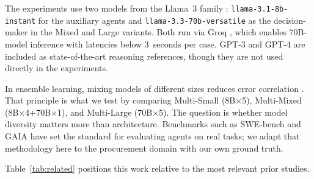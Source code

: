 \documentclass[preprint,12pt,numrefs]{elsarticle}
\begin{document}
The experiments use two models from the Llama~3 family
\citep{Meta2024llama3}: \texttt{llama-3.1-8b-instant} for the auxiliary
agents and \texttt{llama-3.3-70b-versatile} as the decision-maker in
the Mixed and Large variants. Both run via Groq \citep{Groq2024}, which
enables 70B-model inference with latencies below 3~seconds per case.
GPT-3 \citep{Brown2020gpt3} and GPT-4 \citep{OpenAI2023gpt4} are
included as state-of-the-art reasoning references, though they are not
used directly in the experiments.

In ensemble learning, mixing models of different sizes reduces error
correlation \citep{dietterich2000ensemble,Gomes2017ensemble}. That
principle is what we test by comparing Multi-Small (8B$\times$5),
Multi-Mixed (8B$\times$4+70B$\times$1), and Multi-Large (70B$\times$5).
The question is whether model diversity matters more than architecture.
Benchmarks such as SWE-bench \citep{Jimenez2024swebench} and GAIA
\citep{Mialon2023gaia} have set the standard for evaluating agents on
real tasks; we adapt that methodology here to the procurement domain
with our own ground truth.

Table~\ref{tab:related} positions this work relative to the most
relevant prior studies.

\begin{table}[htbp]
\centering
\caption{Comparison with related work. None of the prior studies
         evaluates the trade-off between multi-agent specialization
         and systemic risk detection on real process mining data.}
\label{tab:related}
\end{table}
\end{document}
